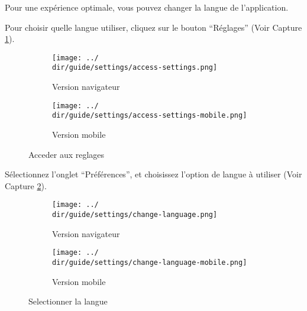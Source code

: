 Pour une expérience optimale, vous pouvez changer la langue de l’application.

Pour choisir quelle langue utiliser, cliquez sur le bouton “Réglages” (Voir Capture \ref{fig:access-settings-lang}).

\begin{figure}[H]
	\begin{subfigure}[b]{0.7\textwidth}
		\texttt{[image: ../\\dir/guide/settings/access-settings.png]}
		\caption{Version navigateur}
	\end{subfigure}
	\begin{subfigure}[b]{0.25\textwidth}
		\texttt{[image: ../\\dir/guide/settings/access-settings-mobile.png]}
		\caption{Version mobile}
	\end{subfigure}
	\caption{Acceder aux reglages}
	\label{fig:access-settings-lang}
\end{figure}

Sélectionnez l’onglet “Préférences”, et choisissez l’option de langue à utiliser (Voir Capture \ref{fig:change-language}).

\begin{figure}[H]
	\begin{subfigure}[b]{0.7\textwidth}
		\texttt{[image: ../\\dir/guide/settings/change-language.png]}
		\caption{Version navigateur}
	\end{subfigure}
	\begin{subfigure}[b]{0.25\textwidth}
		\texttt{[image: ../\\dir/guide/settings/change-language-mobile.png]}
		\caption{Version mobile}
	\end{subfigure}
	\caption{Selectionner la langue}
	\label{fig:change-language}
\end{figure}
